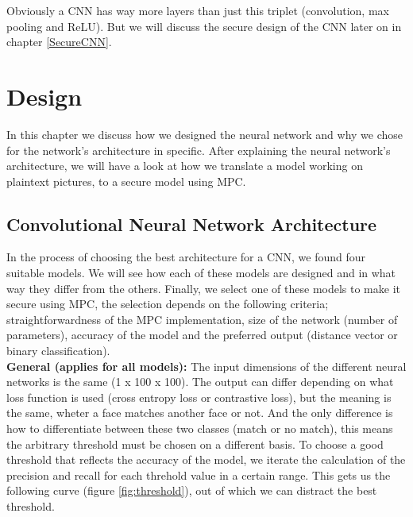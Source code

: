 Obviously a CNN has way more layers than just this triplet (convolution, max pooling and ReLU). But we will discuss the secure design of the CNN later on in chapter \ref{SecureCNN}.

\section{Design}
\label{Design}
In this chapter we discuss how we designed the neural network and why we chose for the network's architecture in specific. After explaining the neural network's architecture, we will have a look at how we translate a model working on plaintext pictures, to a secure model using MPC.

\subsection{Convolutional Neural Network Architecture}
\label{ConvolutionalNeuralNetworkArchitecture}
In the process of choosing the best architecture for a CNN, we found four suitable models. We will see how each of these models are designed and in what way they differ from the others. Finally, we select one of these models to make it secure using MPC, the selection depends on the following criteria; straightforwardness of the MPC implementation, size of the network (number of parameters), accuracy of the model and the preferred output (distance vector or binary classification).\\

\textbf{General (applies for all models):} The input dimensions of the different neural networks is the same (1 x 100 x 100). The output can differ depending on what loss function is used (cross entropy loss or contrastive loss), but the meaning is the same, wheter a face matches another face or not. And the only difference is how to differentiate between these two classes (match or no match), this means the arbitrary threshold must be chosen on a different basis. To choose a good threshold that reflects the accuracy of the model, we iterate the calculation of the precision and recall for each threhold value in a certain range. This gets us the following curve (figure \ref{fig:threshold}), out of which we can distract the best threshold.\\

